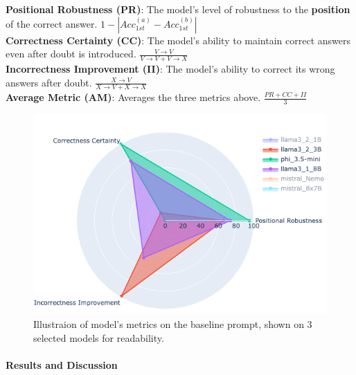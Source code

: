 \begin{itemize}[noitemsep, topsep=2pt]
    \textbf{Positional Robustness (PR)}: The model's level of robustness to the \textbf{position} of the correct answer.
    $1 - \left| Acc_{1st}^{(a)} - Acc_{1st}^{(b)} \right|$\\
    \textbf{Correctness Certainty (CC)}: The model's ability to maintain correct answers even after doubt is introduced.
    $\frac{V \to V}{V \to V + V \to X}$\\
    \textbf{Incorrectness Improvement (II)}: The model's ability to correct its wrong answers after doubt.
    $\frac{X \to V}{X \to V + X \to X}$ \\
    \textbf{Average Metric (AM)}: Averages the three metrics above.
    $\frac{PR + CC + II}{3}$ \\
\end{itemize}

\begin{figure}[ht!]
  \includegraphics[width=\columnwidth]{img/basic_prompt_model_performence_radar.png}
  \caption{Illustraion of model's metrics on the baseline prompt, shown on 3 selected models for readability.}
  \label{rep:Models_Metrics}
\end{figure}

\paragraph{Results and Discussion}

